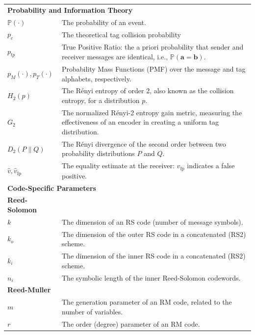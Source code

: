 \documentclass[english,BCOR=4mm,cdfont=false]{tudscrreprt} %
\begin{document}
\begin{longtable}{@{}p{} p{}@{}}
\multicolumn{2}{l}{\textbf{Probability and Information Theory}} \\ \addlinespace
$\mathbb{P}(\cdot)$       & The probability of an event. \\
$p_c$                     & The theoretical tag collision probability\\
$p_{tp}$                  & True Positive Ratio: the a priori probability that sender and receiver messages are identical, i.e., $\mathbb{P}(\boldsymbol{a}=\boldsymbol{b})$. \\
$p_M(\cdot), p_T(\cdot)$ & Probability Mass Functions (PMF) over the message and tag alphabets, respectively. \\
$H_2(p)$                   & The Rényi entropy of order 2, also known as the collision entropy, for a distribution $p$. \\
$G_2$                     & The normalized Rényi-2 entropy gain metric, measuring the effectiveness of an encoder in creating a uniform tag distribution. \\
$D_2(P \| Q)$             & The Rényi divergence of the second order between two probability distributions $P$ and $Q$. \\
$\hat{v}, \hat{v}_\text{fp}$ & The equality estimate at the receiver: $\hat{v}_\text{fp}$ indicates a false positive. \\
\midrule

\multicolumn{2}{l}{\textbf{Code-Specific Parameters}} \\ \addlinespace
\textbf{Reed-Solomon} &  \\
$k$                         & The dimension of an RS code (number of message symbols). \\
$k_o$                       & The dimension of the outer RS code in a concatenated (RS2) scheme. \\
$k_i$                       & The dimension of the inner RS code in a concatenated (RS2) scheme. \\
$n_i$                      & The symbolic length of the inner Reed-Solomon codewords. \\
\addlinespace
\textbf{Reed-Muller}   &  \\
$m$                         & The generation parameter of an RM code, related to the number of variables. \\
$r$                         & The order (degree) parameter of an RM code. \\
\end{longtable}
\end{document}
